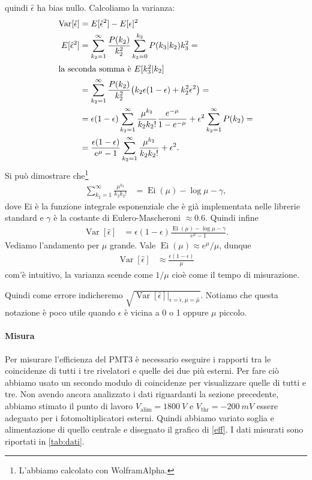 \documentclass[a4paper]{article}
\begin{document}
quindi $\hat\epsilon$ ha bias nullo.
Calcoliamo la varianza:
\begin{align*}
	\operatorname{Var}[\hat\epsilon]
	&= E[\hat\epsilon^2] - E[\epsilon]^2 \\
	E[\hat\epsilon^2]
	&= \sum_{k_2=1}^\infty \frac{P(k_2)}{k_2^2}
	\sum_{k_3=0}^{k_2} P(k_3|k_2) k_3^2 = \\
	\intertext{la seconda somma è $E[k_3^2|k_2]$}
	&= \sum_{k_2=1}^\infty \frac{P(k_2)}{k_2^2}
	\big (k_2\epsilon(1-\epsilon) + k_2^2\epsilon^2 \big) = \\
	&= \epsilon(1-\epsilon) \sum_{k_2=1}^\infty \frac{\mu^{k_2}}{k_2k_2!}\frac{e^{-\mu}}{1-e^{-\mu}}
	+ \epsilon^2 \sum_{k_2=1}^\infty P(k_2) = \\
	&= \frac{\epsilon(1-\epsilon)}{e^{\mu}-1} \sum_{k_2=1}^\infty \frac{\mu^{k_2}}{k_2k_2!} + \epsilon^2.
\end{align*}
Si può dimostrare che\footnote{L'abbiamo calcolato con WolframAlpha.}
\begin{align*}
	\sum_{k_2=1}^\infty \frac{\mu^{k_2}}{k_2k_2!}
	&= \operatorname{Ei}(\mu) - \log\mu - \gamma,
\end{align*}
dove Ei è la funzione integrale esponenziale che è già implementata nelle librerie standard
e $\gamma$ è la costante di Eulero-Mascheroni $\approx 0.6$.
Quindi infine
\begin{align*}
	\operatorname{Var}[\hat\epsilon]
	&= \epsilon(1-\epsilon)\frac{\operatorname{Ei}(\mu) - \log\mu - \gamma}{e^\mu - 1}.
\end{align*}
Vediamo l'andamento per $\mu$ grande.
Vale $\operatorname{Ei}(\mu) \approx e^{\mu}/\mu$, dunque
\begin{align*}
	\operatorname{Var}[\hat\epsilon]
	&\approx \frac{\epsilon(1-\epsilon)}{\mu}
\end{align*}
com'è intuitivo, la varianza scende come $1/\mu$ cioè come il tempo di misurazione.

Quindi come errore indicheremo $\sqrt{\operatorname{Var}[\hat\epsilon]\big|_{\epsilon=\hat\epsilon,\mu=\hat\mu}}$.
Notiamo che questa notazione è poco utile quando $\epsilon$ è vicina a 0 o 1 oppure $\mu$ piccolo.

\paragraph{Misura}

Per misurare l'efficienza del PMT3 è necessario eseguire i rapporti tra le coincidenze di tutti i tre rivelatori e quelle dei due più esterni. Per fare ciò abbiamo usato un secondo modulo di coincidenze per visualizzare quelle di tutti e tre. Non avendo ancora analizzato i dati riguardanti la sezione precedente, abbiamo stimato il punto di lavoro $V_\text{alim}=\SI{1800}{V}$ e $V_{\text{thr}}=\SI{-200}{mV}$ essere adeguato per i fotomoltiplicatori esterni. Quindi abbiamo variato soglia e alimentazione di quello centrale e disegnato il grafico di \autoref{eff}.
I dati misurati sono riportati in \autoref{tab:dati}.
\end{document}
